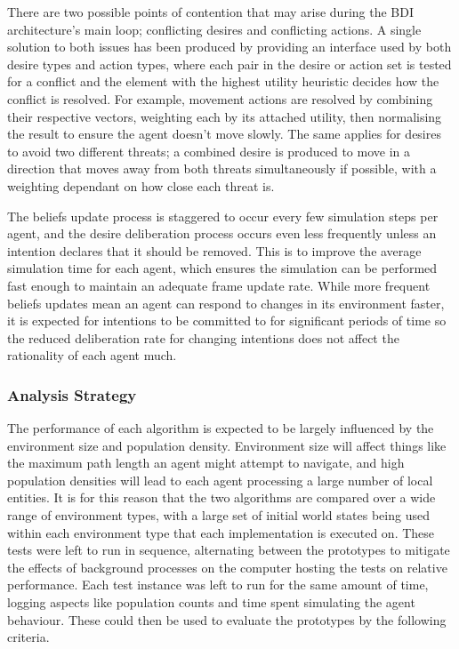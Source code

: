 \documentclass[a4paper,12pt]{article}
\begin{document}
There are two possible points of contention that may arise during the BDI architecture's main loop; conflicting desires and conflicting actions. A single solution to both issues has been produced by providing an interface used by both desire types and action types, where each pair in the desire or action set is tested for a conflict and the element with the highest utility heuristic decides how the conflict is resolved. For example, movement actions are resolved by combining their respective vectors, weighting each by its attached utility, then normalising the result to ensure the agent doesn't move slowly. The same applies for desires to avoid two different threats; a combined desire is produced to move in a direction that moves away from both threats simultaneously if possible, with a weighting dependant on how close each threat is.

The beliefs update process is staggered to occur every few simulation steps per agent, and the desire deliberation process occurs even less frequently unless an intention declares that it should be removed. This is to improve the average simulation time for each agent, which ensures the simulation can be performed fast enough to maintain an adequate frame update rate. While more frequent beliefs updates mean an agent can respond to changes in its environment faster, it is expected for intentions to be committed to for significant periods of time \cite{bonura09} so the reduced deliberation rate for changing intentions does not affect the rationality of each agent much.

\newpage
\subsubsection{Analysis Strategy}\noindent
The performance of each algorithm is expected to be largely influenced by the environment size and population density. Environment size will affect things like the maximum path length an agent might attempt to navigate, and high population densities will lead to each agent processing a large number of local entities. It is for this reason that the two algorithms are compared over a wide range of environment types, with a large set of initial world states being used within each environment type that each implementation is executed on. These tests were left to run in sequence, alternating between the prototypes to mitigate the effects of background processes on the computer hosting the tests on relative performance. Each test instance was left to run for the same amount of time, logging aspects like population counts and time spent simulating the agent behaviour. These could then be used to evaluate the prototypes by the following criteria.
\end{document}
